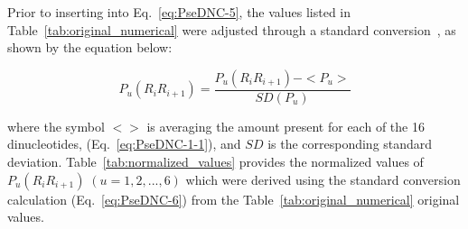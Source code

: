 Prior to inserting into Eq.~\ref{eq:PseDNC-5}, the values listed in Table~\ref{tab:original_numerical} were adjusted through a standard conversion~\cite{Chou2005UsingClasses}, as shown by the equation below:

\begin{equation}\label{eq:PseDNC-6}
    P_{u}(R_{i}R_{i+1}) = \frac{P_{u}(R_{i}R_{i+1}) - <P_{u}>}{SD(P_{u})}
\end{equation}

where the symbol $<>$ is averaging the amount present for each of the 16 dinucleotides, (Eq.~\ref{eq:PseDNC-1-1}), and $SD$ is the corresponding standard deviation. Table~\ref{tab:normalized_values} provides the normalized values of $P_{u}(R_{i}R_{i+1})\;(u = 1,2,...,6)$ which were derived using the standard conversion calculation (Eq.~\ref{eq:PseDNC-6}) from the Table~\ref{tab:original_numerical} original values.

